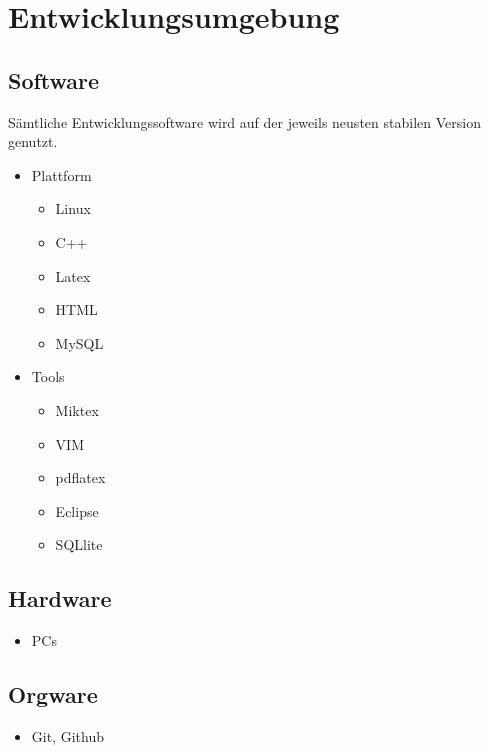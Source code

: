 
\section{Entwicklungsumgebung}


\subsection{Software}

Sämtliche Entwicklungssoftware wird auf der jeweils neusten stabilen Version genutzt.

\begin{itemize}
	\item Plattform
		\begin{itemize}
		\item Linux
			\item C++
			\item Latex
			\item HTML
			\item MySQL
		\end{itemize}
	\item Tools
		\begin{itemize}
			\item Miktex
			\item VIM
			\item pdflatex
			\item Eclipse
			\item SQLlite
		\end{itemize}

\end{itemize}

\subsection{Hardware}

\begin{itemize}
	\item PCs
\end{itemize}

\subsection{Orgware}

\begin{itemize}
	\item Git, Github
\end{itemize}
